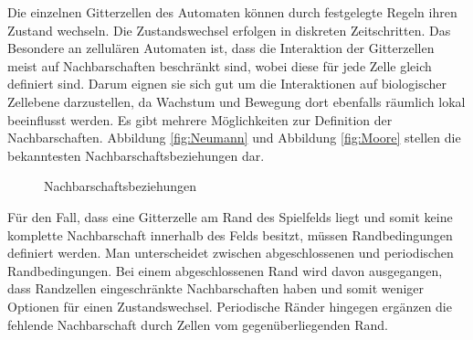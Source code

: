 \documentclass[11pt,a4paper,pointlessnumbers]{scrreprt}  %
\begin{document}
Die einzelnen Gitterzellen des Automaten können durch festgelegte Regeln ihren Zustand wechseln. Die Zustandswechsel erfolgen in diskreten Zeitschritten. Das Besondere an zellulären Automaten ist, dass die Interaktion der Gitterzellen meist auf Nachbarschaften beschränkt sind, wobei diese für jede Zelle gleich definiert sind. Darum eignen sie sich gut um die Interaktionen auf biologischer Zellebene darzustellen, da Wachstum und Bewegung dort ebenfalls räumlich lokal beeinflusst werden. Es gibt mehrere Möglichkeiten zur Definition der Nachbarschaften. Abbildung \ref{fig:Neumann} und Abbildung \ref{fig:Moore} stellen die bekanntesten Nachbarschaftsbeziehungen dar.\newpage

\begin{figure}[!ht]
	\vspace{2cm}
	\caption{Nachbarschaftsbeziehungen \cite{Scholz2014}} 
	\label{fig:Nachbarschaftsbeziehungen}
\end{figure} 

Für den Fall, dass eine Gitterzelle am Rand des Spielfelds liegt und somit keine komplette Nachbarschaft innerhalb des Felds besitzt, müssen Randbedingungen definiert werden. Man unterscheidet zwischen abgeschlossenen und periodischen Randbedingungen. Bei einem abgeschlossenen Rand wird davon ausgegangen, dass Randzellen eingeschränkte Nachbarschaften haben und somit weniger Optionen für einen Zustandswechsel. Periodische Ränder hingegen ergänzen die fehlende Nachbarschaft durch Zellen vom gegenüberliegenden Rand. \par
\end{document}
